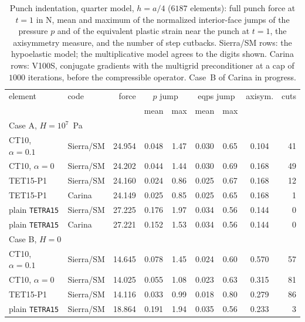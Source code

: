 \documentclass{article}
\newcommand{\code}[1]{\texttt{#1}}
\theoremstyle{definition}
\theoremstyle{plain}
\begin{document}
\begin{table}[tbp]
\centering
\caption{Punch indentation, quarter model, $h = a/4$ ($6187$ elements):
full punch force at $t = 1$ in N, mean and maximum of the normalized
interior-face jumps of the pressure $p$ and of the equivalent plastic
strain near the punch at $t = 1$, the axisymmetry measure, and the number
of step cutbacks. Sierra/SM rows: the hypoelastic model; the multiplicative
model agrees to the digits shown. Carina rows: V100S, conjugate gradients
with the multigrid preconditioner at a cap of $1000$ iterations, before the
compressible operator. Case~B of Carina in progress.}
\label{tab:punch}
\begin{tabular}{llr cc cc c r}
\toprule
element & code & force & \multicolumn{2}{c}{$p$ jump} & \multicolumn{2}{c}{eqps jump} & axisym. & cuts \\
 & & & mean & max & mean & max & & \\
\midrule
\multicolumn{9}{l}{Case A, $H = 10^7$~Pa} \\
CT10, $\alpha = 0.1$ & Sierra/SM & 24.954 & 0.048 & 1.47 & 0.030 & 0.65 & 0.104 & 41 \\
CT10, $\alpha = 0$   & Sierra/SM & 24.202 & 0.044 & 1.44 & 0.030 & 0.69 & 0.168 & 49 \\
TET15-P1                       & Sierra/SM & 24.160 & 0.024 & 0.86 & 0.025 & 0.67 & 0.168 & 12 \\
TET15-P1                       & Carina    & 24.149 & 0.025 & 0.85 & 0.025 & 0.65 & 0.168 & 1 \\
plain \code{TETRA15}           & Sierra/SM & 27.225 & 0.176 & 1.97 & 0.034 & 0.56 & 0.144 & 0 \\
plain \code{TETRA15}           & Carina    & 27.221 & 0.152 & 1.53 & 0.034 & 0.56 & 0.144 & 0 \\
\midrule
\multicolumn{9}{l}{Case B, $H = 0$} \\
CT10, $\alpha = 0.1$ & Sierra/SM & 14.645 & 0.078 & 1.45 & 0.024 & 0.60 & 0.570 & 57 \\
CT10, $\alpha = 0$   & Sierra/SM & 14.025 & 0.055 & 1.08 & 0.023 & 0.63 & 0.315 & 81 \\
TET15-P1                       & Sierra/SM & 14.116 & 0.033 & 0.99 & 0.018 & 0.80 & 0.279 & 86 \\
plain \code{TETRA15}           & Sierra/SM & 18.864 & 0.191 & 1.94 & 0.035 & 0.56 & 0.233 & 3 \\
\bottomrule
\end{tabular}
\end{table}
\end{document}
